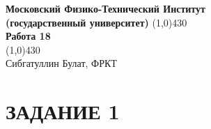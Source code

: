\documentclass[a4paper, 12pt]{article}%
\begin{document}
\begin{titlepage}

\begin{center}
\large\textbf{Московский Физико-Технический Институт}\\
\large\textbf{(государственный университет)}
\vfill
\line(1,0){430}\\[1mm]
\huge\textbf{Работа 18}\\
\line(1,0){430}\\[1mm]
\vfill
\large Сибгатуллин Булат, ФРКТ\\
\end{center}

\end{titlepage}

\section*{ЗАДАНИЕ 1}
\end{document}
